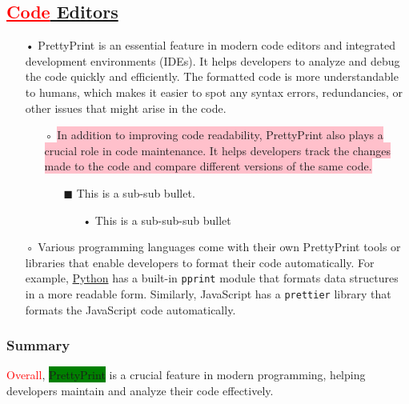 \documentclass[12pt, a4paper]{article}
\begin{document}
\subsection{\textcolor{red}{\underline{Code}}\underline{ Editors}}
\begin{itemize}
\item[•] PrettyPrint is an essential feature in modern code editors and integrated development environments (IDEs). It helps developers to analyze and debug the code quickly and efficiently. The formatted code is more understandable to humans, which makes it easier to spot any syntax errors, redundancies, or other issues that might arise in the code.
\begin{itemize}
\item[◦] \colorbox{pink}{In addition to improving code readability, PrettyPrint also plays a crucial role in code maintenance. It helps developers track the changes made to the code and compare different versions of the same code.}
\begin{itemize}
\item[$\blacksquare$] This is a sub-sub bullet.
\begin{itemize}
\item[•] This is a sub-sub-sub bullet
\end{itemize}
\end{itemize}
\end{itemize}
\item[◦] Various programming languages come with their own PrettyPrint tools or libraries that enable developers to format their code automatically. For example, \href{http://python.org/}{Python} has a built-in \texttt{pprint} module that formats data structures in a more readable form. Similarly, JavaScript has a \texttt{prettier} library that formats the JavaScript code automatically.
\end{itemize}
\subsubsection{Summary}
\textcolor{red}{Overall}, \colorbox{green}{PrettyPrint} is a crucial feature in modern programming, helping developers maintain and analyze their code effectively.
\end{document}
